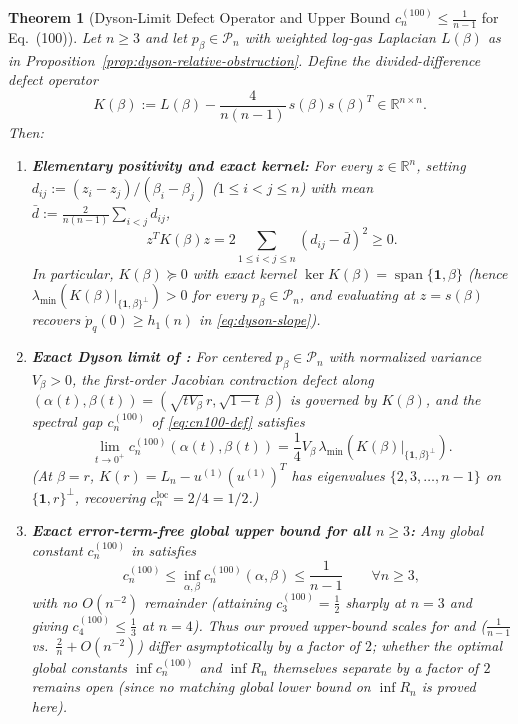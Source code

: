 \documentclass[11pt,a4paper]{article}
\newtheorem{theorem}{Theorem}[section]
\theoremstyle{definition}
\DeclareMathOperator{\Span}{span}
\newcommand{\R}{\mathbb{R}}
\newcommand{\one}{\mathbf{1}}
\begin{document}
\begin{theorem}[Dyson-Limit Defect Operator and Upper Bound $c_n^{(100)} \le \frac{1}{n-1}$ for Eq.~(100)]
\label{thm:matrix-stam-eq100}
Let $n \ge 3$ and let $p_\beta \in \mathcal{P}_n$ with weighted log-gas Laplacian $L(\beta)$ as in Proposition~\ref{prop:dyson-relative-obstruction}. Define the divided-difference defect operator
\[
K(\beta) := L(\beta) - \frac{4}{n(n-1)}\, s(\beta) s(\beta)^T \in \R^{n \times n}.
\]
Then:
\begin{enumerate}
\item[(a)] \textbf{Elementary positivity and exact kernel:} For every $z \in \R^n$, setting $d_{ij} := (z_i - z_j)/(\beta_i - \beta_j)$ ($1 \le i < j \le n$) with mean $\bar{d} := \frac{2}{n(n-1)}\sum_{i<j} d_{ij}$,
\[
z^T K(\beta) z = 2\sum_{1 \le i < j \le n} (d_{ij} - \bar{d})^2 \ge 0.
\]
In particular, $K(\beta) \succeq 0$ with exact kernel $\ker K(\beta) = \Span\{\one, \beta\}$ (hence $\lambda_{\min}(K(\beta)|_{\{\one,\beta\}^\perp}) > 0$ for every $p_\beta \in \mathcal{P}_n$, and evaluating at $z = s(\beta)$ recovers $\dot{p}_q(0) \ge h_1(n)$ in \eqref{eq:dyson-slope}).
\item[(b)] \textbf{Exact Dyson limit of \cite[eq.~(100)]{HH2026}:} For centered $p_\beta \in \mathcal{P}_n$ with normalized variance $V_\beta > 0$, the first-order Jacobian contraction defect along $(\alpha(t), \beta(t)) = (\sqrt{t V_\beta}\, r, \sqrt{1-t}\,\beta)$ is governed by $K(\beta)$, and the spectral gap $c_n^{(100)}$ of \eqref{eq:cn100-def} satisfies
\[
\lim_{t \to 0^+} c_n^{(100)}(\alpha(t), \beta(t)) = \frac{1}{4} V_\beta\, \lambda_{\min}\!\left(K(\beta)\big|_{\{\one,\beta\}^\perp}\right).
\]
(At $\beta = r$, $K(r) = L_n - u^{(1)}(u^{(1)})^T$ has eigenvalues $\{2, 3, \dots, n-1\}$ on $\{\one, r\}^\perp$, recovering $c_n^{\mathrm{loc}} = 2/4 = 1/2$.)
\item[(c)] \textbf{Exact error-term-free global upper bound for all $n \ge 3$:} Any global constant $c_n^{(100)}$ in \cite[Conjecture~8.1 / eq.~(100)]{HH2026} satisfies
\[
c_n^{(100)} \le \inf_{\alpha, \beta} c_n^{(100)}(\alpha, \beta) \le \frac{1}{n - 1} \qquad \forall n \ge 3,
\]
with no $O(n^{-2})$ remainder (attaining $c_3^{(100)} = \frac{1}{2}$ sharply at $n = 3$ and giving $c_4^{(100)} \le \frac{1}{3}$ at $n = 4$). Thus our proved upper-bound scales for \cite[eq.~(100)]{HH2026} and \cite[eq.~(101)]{HH2026} ($\frac{1}{n-1}$ vs.\ $\frac{2}{n} + O(n^{-2})$) differ asymptotically by a factor of $2$; whether the \emph{optimal} global constants $\inf c_n^{(100)}$ and $\inf R_n$ themselves separate by a factor of $2$ remains open (since no matching global lower bound on $\inf R_n$ is proved here).
\end{enumerate}
\end{theorem}
\end{document}
